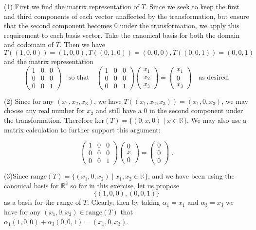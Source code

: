 \documentclass[11pt]{article}
\begin{document}
(1) First we find the matrix representation of $T$. Since we seek to keep the first and third components of each vector unaffected by the transformation, but ensure that the second component becomes 0 under the transformation, we apply this requirement to each basis vector. Take the canonical basis for both the domain and codomain of $T$. Then we have $T((1,0,0)) = (1,0,0), T((0,1,0)) = (0,0,0), T((0,0,1)) = (0,0,1)$ and the matrix representation
$$\begin{pmatrix}
1&0&0\\0&0&0\\0&0&1
\end{pmatrix} \quad \text{so that} \quad \begin{pmatrix}
1&0&0\\0&0&0\\0&0&1
\end{pmatrix} \begin{pmatrix}
x_1\\x_2\\x_3
\end{pmatrix} = \begin{pmatrix}
x_1\\0\\x_3
\end{pmatrix} \quad \text{as desired.}$$

(2) Since for any $(x_1,x_2,x_3)$, we have $T((x_1,x_2,x_3)) = (x_1,0,x_3)$, we may choose any real number for $x_2$ and still have a 0 in the second component under the transformation. Therefore $\text{ker}(T) = \{(0,x,0) \;|\; x \in \mathbb{R}\}$. We may also use a matrix calculation to further support this argument:

$$
\begin{pmatrix}
1&0&0\\0&0&0\\0&0&1
\end{pmatrix} \begin{pmatrix}
0\\x\\0
\end{pmatrix} = \begin{pmatrix}
0\\0\\0
\end{pmatrix}
\;.$$

(3)Since $\text{range}(T) = \{(x_1,0,x_2) \;|\; x_1,x_2 \in \mathbb{R}\}$, and we have been using the canonical basis for $\mathbb{R}^3$ so far in this exercise, let us propose $$\{(1,0,0), (0,0,1)\}$$ as a basis for the range of $T$. Clearly, then by taking $\alpha_1 = x_1$ and $\alpha_3 = x_3$ we have for any $(x_1,0,x_3) \in \text{range}(T)$ that $\alpha_1(1,0,0) + \alpha_3(0,0,1) = (x_1,0,x_3)$. 
\end{document}
